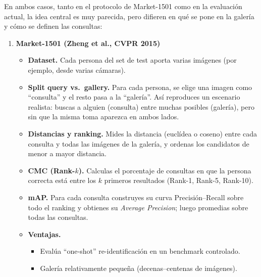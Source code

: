 \documentclass[12pt, a4paper, twoside]{article}
\begin{document}
 	En ambos casos, tanto en el protocolo de Market-1501 como en la evaluación actual, la idea central es muy parecida, pero difieren en qué se pone en la galería y cómo se definen las consultas:
 	
 	\begin{enumerate}
 		\item \textbf{Market-1501 (Zheng et al., CVPR 2015)}
 		\begin{itemize}
 			\item \textbf{Dataset.}  
 			Cada persona del set de test aporta varias imágenes (por ejemplo, desde varias cámaras).
 			\item \textbf{Split query vs.\ gallery.}  
 			Para cada persona, se elige una imagen como “consulta” y el resto pasa a la “galería”.  
 			Así reproduces un escenario realista: buscas a alguien (consulta) entre muchas posibles (galería), pero sin que la misma toma aparezca en ambos lados.
 			\item \textbf{Distancias y ranking.}  
 			Mides la distancia (euclídea o coseno) entre cada consulta y todas las imágenes de la galería, y ordenas los candidatos de menor a mayor distancia.
 			\item \textbf{CMC (Rank-\(k\)).}  
 			Calculas el porcentaje de consultas en que la persona correcta está entre los \(k\) primeros resultados (Rank-1, Rank-5, Rank-10).
 			\item \textbf{mAP.}  
 			Para cada consulta construyes su curva Precisión–Recall sobre todo el ranking y obtienes su \emph{Average Precision}; luego promedias sobre todas las consultas.
 			\item \textbf{Ventajas.}
 			\begin{itemize}
 				\item Evalúa “one‐shot” re-identificación en un benchmark controlado.
 				\item Galería relativamente pequeña (decenas–centenas de imágenes).
 			\end{itemize}
 		\end{itemize}
 		

\end{enumerate}
\end{document}
